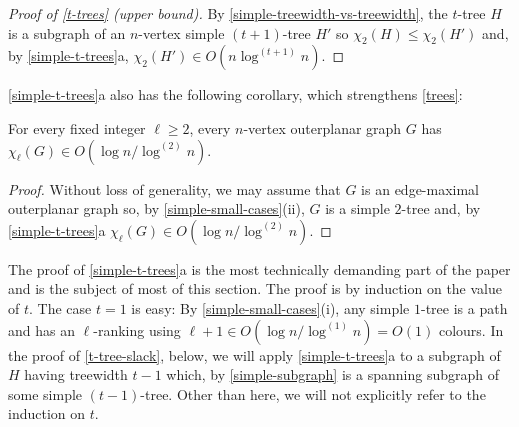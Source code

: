 \documentclass[kpfonts]{patmorin}
\newcommand{\trn}{\chi_2}
\newcommand{\lrn}{\chi_{\ell}}
\theoremstyle{named}
\newcommand{\weirdref}[2]{\cref{#1}#2}
\begin{document}
\begin{proof}[Proof of \cref{t-trees} (upper bound)]
    By \cref{simple-treewidth-vs-treewidth}, the $t$-tree $H$ is a subgraph of an $n$-vertex simple $(t+1)$-tree $H'$ so $\trn(H)\le \trn(H')$ and, by   \weirdref{simple-t-trees}{a}, $\trn(H')\in O(n\log^{(t+1)}n)$.
\end{proof}

\weirdref{simple-t-trees}{a} also has the following corollary, which strengthens \cref{trees}:

\begin{cor}\label{outerplanar}
    For every fixed integer $\ell\ge 2$, every $n$-vertex outerplanar graph $G$ has $\lrn(G)\in O(\log n/\log^{(2)} n)$.
\end{cor}

\begin{proof}
    Without loss of generality, we may assume that $G$ is an edge-maximal outerplanar graph so, by \cref{simple-small-cases}{(ii)}, $G$ is a simple $2$-tree and, by \weirdref{simple-t-trees}{a} $\lrn(G)\in O(\log n/\log^{(2)} n)$.
\end{proof}

The proof of \weirdref{simple-t-trees}{a} is the most technically demanding part of the paper and is the subject of most of this section.  The proof is by induction on the value of $t$. The case $t=1$ is easy: By \cref{simple-small-cases}(i), any simple $1$-tree is a path and has an $\ell$-ranking using $\ell+1\in O(\log n/\log^{(1)} n) = O(1)$ colours.  In the proof of \cref{t-tree-slack}, below, we will apply \weirdref{simple-t-trees}{a} to a subgraph of $H$ having treewidth $t-1$ which, by \cref{simple-subgraph} is a spanning subgraph of some simple $(t-1)$-tree.  Other than here, we will not explicitly refer to the induction on $t$.\label{induction-note}
\end{document}
